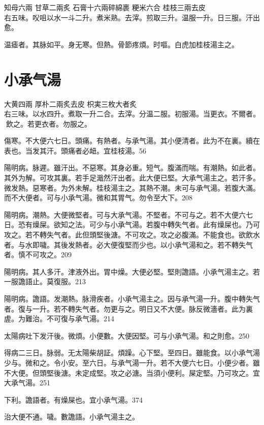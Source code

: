 知母{\scriptsize 六兩} 甘草{\scriptsize 二兩炙} 石膏{\scriptsize 十六兩碎綿裹} 粳米{\scriptsize 六合} 桂枝{\scriptsize 三兩去皮}\\
右五味。㕮咀以水一斗二升。煮米熟。去滓。煎取三升。温服一升。日三服。汗出愈。

温瘧者。其脉如平。身无寒。但熱。骨節疼煩。时嘔。白虎加桂枝湯主之。

\section{小承气湯}

大黄{\scriptsize 四兩} 厚朴{\scriptsize 二兩炙去皮} 枳実{\scriptsize 三枚大者炙}\\
右三味。以水四升。煮取一升二合。去滓。分温二服。初服湯。当更衣。不爾者。{\sungii 𥁞}飲之。若更衣者。勿服之。

傷寒。不大便六七日。頭痛。有熱者。与承气湯。其小便清者。此为不在裏。續在表也。当发其汗。頭痛者必衄。宜桂枝湯。56

陽明病。脉遲。雖汗出。不惡寒。其身必重。短气。腹滿而喘。有潮熱。如此者。其外为解。可攻其裏。若手足濈然汗出者。此大便已堅。{\khaai 大}承气湯主之。若汗多。微发熱。惡寒者。为外未解。{\khaai 桂枝湯主之。}其熱不潮。未可与承气湯。若腹大滿。而不大便者。可与小承气湯。微和其胃气。勿令至大下。208

陽明病。潮熱。大便微堅者。可与{\khaai 大}承气湯。不堅者。不可与之。若不大便六七日。恐有燥屎。欲知之法。可少与小承气湯。若腹中轉失气者。此有燥屎也。乃可攻之。若不轉失气者。此但頭堅後溏。不可攻之。攻之必腹滿。不能食也。欲飲水者。与水即噦。其後发熱者。必大便復堅而少也。以小承气湯和之。若不轉失气者。慎不可攻之。209

陽明病。其人多汗。津液外出。胃中燥。大便必堅。堅則譫語。{\khaai 小}承气湯主之。{\khaai 若一服譫語止。莫復服。}213

陽明病。譫語。发潮熱。脉滑疾者。{\khaai 小}承气湯主之。因与承气湯一升。腹中轉失气者。復与一升。若不轉失气者。勿更与之。明日又不大便。脉反微濇者。此为裏虗。为難治。不可復与承气湯。214

太陽病吐下发汗後。微煩。小便數。大便因堅。可与小承气湯。和之則愈。250

得病二三日。脉弱。无太陽柴胡証。煩躁。心下堅。至四日。雖能食。以{\khaai 小}承气湯少与。微和之。令小安。至六日。与承气湯一升。若不大便六七日。小便少者。雖不大便。但頭堅後溏。未定成堅。攻之必溏。当須小便利。屎定堅。乃可攻之。宜{\khaai 大}承气湯。251

下利。譫語者。有燥屎也。宜{\khaai 小}承气湯。374

治大便不通。噦。數譫語。小承气湯主之。

